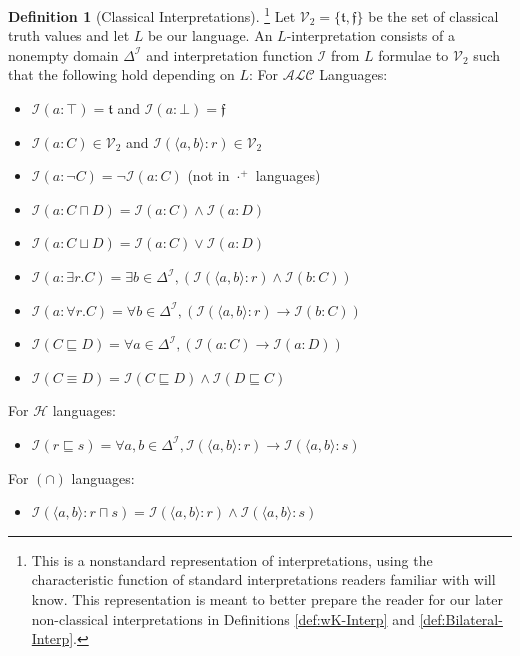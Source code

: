 \documentclass[letterpaper]{article} %
\theoremstyle{definition}
\theoremstyle{definition}
\newtheorem{definition}{Definition}
\theoremstyle{definition}
\theoremstyle{definition}
\theoremstyle{definition}
\newcommand{\isa}{\mathbin{{:}}}
\newcommand{\vt}{\mathfrak{t}}
\newcommand{\vf}{\mathfrak{f}}
\begin{document}
\begin{definition}[Classical Interpretations]\label{def:ALC-Interp-Non-Standard}\footnote{This is a nonstandard representation of interpretations, using the characteristic function of standard interpretations readers familiar with \cite{DBLP:conf/dlog/2003handbook} will know. This representation is meant to better prepare the reader for our later non-classical interpretations in Definitions \ref{def:wK-Interp} and \ref{def:Bilateral-Interp}.} Let $\mathcal{V}_2 = \{\vt,\vf\}$ be the set of classical truth values and let $L$ be our language. An $L$-interpretation consists of a nonempty domain $\Delta^{\mathcal{I}}$ and interpretation function $\mathcal{I}$ from $L$ formulae to $\mathcal{V}_2$ such that the following hold depending on $L$: For $\mathcal{ALC}$ Languages:
\begin{itemize}
		\item $\mathcal{I}(a\isa\top)=\vt$ and $\mathcal{I}(a\isa\bot)=\vf$
		\item $\mathcal{I}(a\isa C)\in\mathcal{V}_{2}$ and $\mathcal{I}(\langle a,b\rangle\isa r)\in\mathcal{V}_{2}$
        \item $\mathcal{I}(a\isa\neg C)=\lnot\mathcal{I}(a\isa C)$ (not in $\cdot^+$ languages)
		\item $\mathcal{I}(a\isa C\sqcap D)=\mathcal{I}(a\isa C)\land\mathcal{I}(a\isa D)$
		\item $\mathcal{I}(a\isa C\sqcup D)=\mathcal{I}(a\isa C)\lor\mathcal{I}(a\isa D)$
		\item $\mathcal{I}(a\isa\exists r.C) =\exists {b\in\Delta^{\mathcal{I}}}, \left( \mathcal{I}(\langle a,b\rangle\isa r) \land \mathcal{I}(b\isa C) \right)$ \item $\mathcal{I}(a\isa\forall r.C) =\forall {b\in\Delta^{\mathcal{I}}}, \left( \mathcal{I}(\langle a,b\rangle\isa r) \rightarrow \mathcal{I}(b\isa C) \right)$ \item $\mathcal{I}(C\sqsubseteq D) =\forall{a\in\Delta^{\mathcal{I}}}, \left( \mathcal{I}(a\isa C) \rightarrow \mathcal{I}(a\isa D) \right)$ \item $\mathcal{I}(C\equiv D) =\mathcal{I}(C\sqsubseteq D) \land \mathcal{I}(D\sqsubseteq C)$
    \end{itemize}
    \noindent For $\mathcal{H}$ languages:
    \begin{itemize}
        \item $\mathcal{I}(r \sqsubseteq s) = \forall a,b \in \Delta^\mathcal{I}, \mathcal{I}(\langle a, b\rangle : r) \rightarrow \mathcal{I}(\langle a, b\rangle : s)$
	\end{itemize}
    \noindent For $(\cap)$ languages:
    \begin{itemize}
        \item $\mathcal{I}(\langle a, b\rangle : r \sqcap s) = \mathcal{I}(\langle a, b\rangle : r) \land \mathcal{I}(\langle a, b\rangle : s)$
    \end{itemize}
\end{definition}
\end{document}
